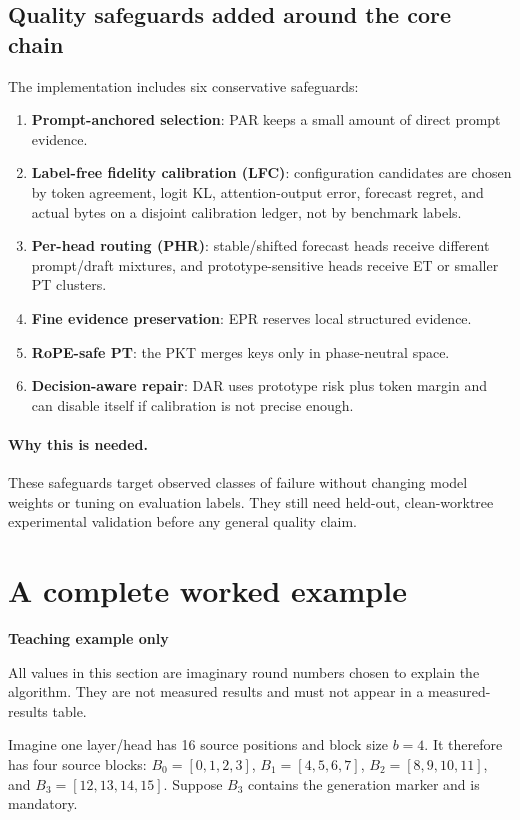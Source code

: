 \documentclass[11pt]{article}
\newcommand{\term}[1]{\textbf{#1}}
\newcommand{\why}{\paragraph{Why this is needed.}}
\newenvironment{plainbox}[1]{%
  \begin{center}\begin{minipage}{0.94\linewidth}
  \colorbox{mklight}{\parbox{0.965\linewidth}{\textbf{#1}\par\smallskip}}
  \vspace{-0.5em}\small
}{%
  \end{minipage}\end{center}
}
\begin{document}
\subsection{Quality safeguards added around the core chain}

The implementation includes six conservative safeguards:

\begin{enumerate}
  \item \term{Prompt-anchored selection}: PAR keeps a small amount of direct prompt evidence.
  \item \term{Label-free fidelity calibration (LFC)}: configuration candidates are chosen by
        token agreement, logit KL, attention-output error, forecast regret, and actual bytes on a
        disjoint calibration ledger, not by benchmark labels.
  \item \term{Per-head routing (PHR)}: stable/shifted forecast heads receive different prompt/draft
        mixtures, and prototype-sensitive heads receive ET or smaller PT clusters.
  \item \term{Fine evidence preservation}: EPR reserves local structured evidence.
  \item \term{RoPE-safe PT}: the PKT merges keys only in phase-neutral space.
  \item \term{Decision-aware repair}: DAR uses prototype risk plus token margin and can disable
        itself if calibration is not precise enough.
\end{enumerate}

\why These safeguards target observed classes of failure without changing model weights or tuning
on evaluation labels. They still need held-out, clean-worktree experimental validation before any
general quality claim.

\section{A complete worked example}
\label{sec:example}

\begin{plainbox}{Teaching example only}
All values in this section are imaginary round numbers chosen to explain the algorithm. They are
not measured results and must not appear in a measured-results table.
\end{plainbox}

Imagine one layer/head has 16 source positions and block size $b=4$. It therefore has four source
blocks: $B_0=[0,1,2,3]$, $B_1=[4,5,6,7]$, $B_2=[8,9,10,11]$, and
$B_3=[12,13,14,15]$. Suppose $B_3$ contains the generation marker and is mandatory.
\end{document}
